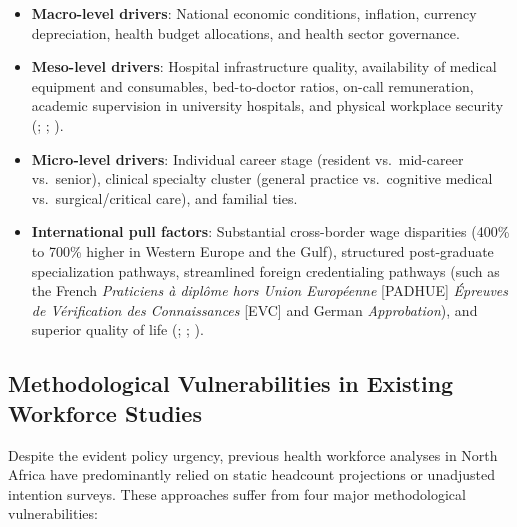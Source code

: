 \documentclass[
  11pt,
  a4paper]{article}
\providecommand{\tightlist}{%
  \setlength{\itemsep}{0pt}\setlength{\parskip}{0pt}}
\begin{document}
\begin{enumerate}
  \begin{itemize}
  \tightlist
  \item
    \textbf{Macro-level drivers}: National economic conditions,
    inflation, currency depreciation, health budget allocations, and
    health sector governance.
  \item
    \textbf{Meso-level drivers}: Hospital infrastructure quality,
    availability of medical equipment and consumables, bed-to-doctor
    ratios, on-call remuneration, academic supervision in university
    hospitals, and physical workplace security
    (;
    ;
    ).
  \item
    \textbf{Micro-level drivers}: Individual career stage (resident
    vs.~mid-career vs.~senior), clinical specialty cluster (general
    practice vs.~cognitive medical vs.~surgical/critical care), and
    familial ties.
  \item
    \textbf{International pull factors}: Substantial cross-border wage
    disparities (400\% to 700\% higher in Western Europe and the Gulf),
    structured post-graduate specialization pathways, streamlined
    foreign credentialing pathways (such as the French \emph{Praticiens
    à diplôme hors Union Européenne} {[}PADHUE{]} \emph{Épreuves de
    Vérification des Connaissances} {[}EVC{]} and German
    \emph{Approbation}), and superior quality of life
    (;
    ;
    ).
  \end{itemize}
\end{enumerate}

\subsection{Methodological Vulnerabilities in Existing Workforce
Studies}\label{sec-intro-gaps}

Despite the evident policy urgency, previous health workforce analyses
in North Africa have predominantly relied on static headcount
projections or unadjusted intention surveys. These approaches suffer
from four major methodological vulnerabilities:
\end{document}
